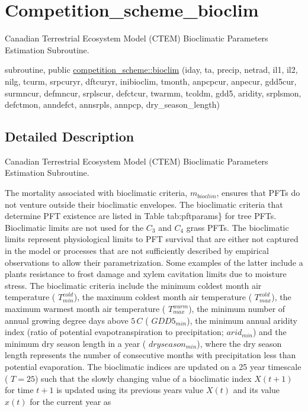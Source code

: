 \hypertarget{group__competition__scheme__bioclim}{}\section{Competition\+\_\+scheme\+\_\+bioclim}
\label{group__competition__scheme__bioclim}


Canadian Terrestrial Ecosystem Model (C\+T\+E\+M) Bioclimatic Parameters Estimation Subroutine.  


\begin{DoxyCompactItemize}
\item 
subroutine, public \hyperlink{group__competition__scheme__bioclim_ga63e17c7f18b8ab7e782acf1b3d957dd8}{competition\+\_\+scheme\+::bioclim} (iday, ta, precip, netrad, il1, il2, nilg, tcurm, srpcuryr, dftcuryr, inibioclim, tmonth, anpcpcur, anpecur, gdd5cur, surmncur, defmncur, srplscur, defctcur, twarmm, tcoldm, gdd5, aridity, srplsmon, defctmon, anndefct, annsrpls, annpcp, dry\+\_\+season\+\_\+length)
\end{DoxyCompactItemize}


\subsection{Detailed Description}
Canadian Terrestrial Ecosystem Model (C\+T\+E\+M) Bioclimatic Parameters Estimation Subroutine. 

The mortality associated with bioclimatic criteria, $m_{bioclim}$, ensures that P\+F\+Ts do not venture outside their bioclimatic envelopes. The bioclimatic criteria that determine P\+F\+T existence are listed in Table tab\+:pftparams\} for tree P\+F\+Ts. Bioclimatic limits are not used for the $C_3$ and $C_4$ grass P\+F\+Ts. The bioclimatic limits represent physiological limits to P\+F\+T survival that are either not captured in the model or processes that are not sufficiently described by empirical observations to allow their parametrization. Some examples of the latter include a plant\textquotesingle{}s resistance to frost damage and xylem cavitation limits due to moisture stress. The bioclimatic criteria include the minimum coldest month air temperature ( $T^{cold}_{min}$), the maximum coldest month air temperature ( $T^{cold}_{max}$), the maximum warmest month air temperature ( $T^{warm}_{max}$), the minimum number of annual growing degree days above $5\,C$ ( $GDD5_{min}$), the minimum annual aridity index (ratio of potential evapotranspiration to precipitation; $arid_{min}$) and the minimum dry season length in a year ( $dryseason_{min}$), where the dry season length represents the number of consecutive months with precipitation less than potential evaporation. The bioclimatic indices are updated on a 25 year timescale ( $T=25$) such that the slowly changing value of a bioclimatic index $X(t+1)$ for time $t+1$ is updated using its previous year\textquotesingle{}s value $X(t)$ and its value $x(t)$ for the current year as

